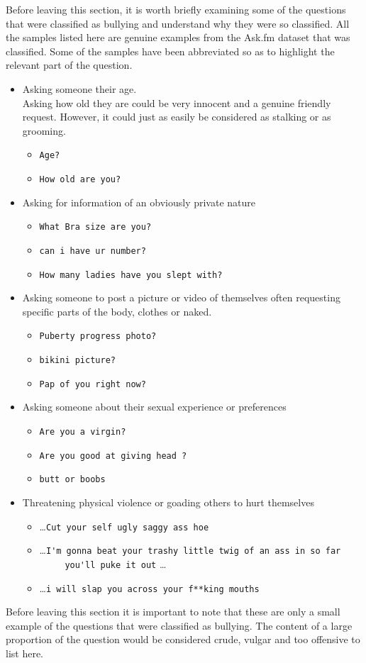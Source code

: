 Before leaving this section, it is worth briefly examining some of the questions that were classified as bullying and understand why they were so classified. All the samples listed here are genuine examples from the Ask.fm dataset that was classified. Some of the samples have been abbreviated so as to highlight the relevant part of the question.

\begin{itemize}

	\item Asking someone their age. \\
	Asking how old they are could be very innocent and a genuine friendly request. However, it could just as easily be considered as stalking or as grooming. 
		\begin{itemize}
			\item \verb|Age?|
			\item \verb|How old are you?| 
		\end{itemize}
		
	\item Asking for information of an obviously private nature
		\begin{itemize}
			\item \verb|What Bra size are you?|
			\item \verb|can i have ur number?|
			\item \verb|How many ladies have you slept with?|
		\end{itemize} 

	\item Asking someone to post a picture or video of themselves often requesting specific parts of the body, clothes or naked.
		\begin{itemize}
			\item \verb|Puberty progress photo?|
			\item \verb|bikini picture?|
			\item \verb|Pap of you right now?|
		\end{itemize}

	\item Asking someone about their sexual experience or preferences
		\begin{itemize}
			\item \verb|Are you a virgin?|
			\item \verb|Are you good at giving head ?|
			\item \verb|butt or boobs|
		\end{itemize}
	
	\item Threatening physical violence or goading others to hurt themselves
		\begin{itemize}
			\item \dots \verb|Cut your self ugly saggy ass hoe|
			\item \dots \verb|I'm gonna beat your trashy little twig of an ass in so far| \\ \verb|     you'll puke it out| \dots
			\item \dots \verb|i will slap you across your f**king mouths|
		\end{itemize}

\end{itemize}

Before leaving this section it is important to note that these are only a small example of the questions that were classified as bullying. The content of a large proportion of the question would be considered crude, vulgar and too offensive to list here.